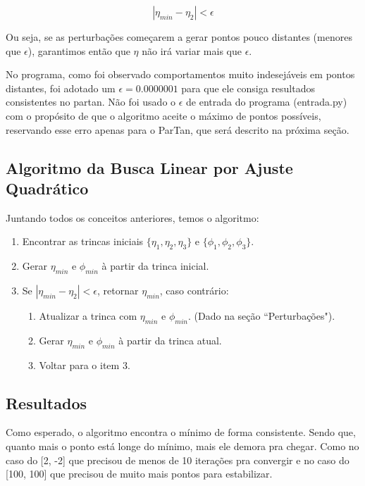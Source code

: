 \documentclass[12pt]{article}
\begin{document}
\begin{equation}
	|\eta_{min} − \eta_2| < \epsilon
\end{equation}

Ou seja, se as perturbações começarem a gerar pontos pouco distantes (menores que $\epsilon$), garantimos então que $\eta$ não irá variar mais que $\epsilon$.

No programa, como foi observado comportamentos muito indesejáveis em pontos distantes, foi adotado um $\epsilon = 0.0000001$ para que ele consiga resultados consistentes no partan. Não foi usado o $\epsilon$ de entrada do programa (entrada.py) com o propósito de que o algoritmo aceite o máximo de pontos possíveis, reservando esse erro apenas para o ParTan, que será descrito na próxima seção.

\subsection{Algoritmo da Busca Linear por Ajuste Quadrático}
\mbox{}

Juntando todos os conceitos anteriores, temos o algoritmo:

\begin{enumerate}
	\item Encontrar as trincas iniciais $\{\eta_1, \eta_2,\eta_3\}$ e $\{\phi_1, \phi_2, \phi_3\}$.
	\item Gerar $\eta_{min}$ e $\phi_{min}$ à partir da trinca inicial.
	\item Se $|\eta_{min} − \eta_2| < \epsilon$, retornar $\eta_{min}$, caso contrário:
	\begin{enumerate}
		\item Atualizar a trinca com $\eta_{min}$ e $\phi_{min}$. (Dado na seção ``Perturbações").
		\item Gerar $\eta_{min}$ e $\phi_{min}$ à partir da trinca atual.
		\item Voltar para o item 3.
	\end{enumerate}
\end{enumerate}

\subsection{Resultados}
\mbox{}

Como esperado, o algoritmo encontra o mínimo de forma consistente. Sendo que, quanto mais o ponto está longe do mínimo, mais ele demora pra chegar. Como no caso do [2, -2] que precisou de menos de 10 iterações pra convergir e no caso do [100, 100] que precisou de muito mais pontos para estabilizar. 
\end{document}
